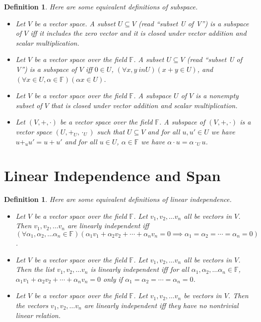 \documentclass[12pt]{article}
\newcounter{prmc}
\newtheorem{dfn}[prmc]{Definition}
\begin{document}
\begin{dfn}
  Here are some equivalent definitions of subspace.
  \begin{itemize}
    \item Let $V$ be a vector space.  A subset $U\subseteq V$ (read
      ``subset U of V'') is a subspace of $V$ iff it includes the zero
      vector and it is closed under vector addition and scalar
      multiplication. 
    \item Let $V$ be a vector space over the field $\mathbb{F}$.  A
      subset $U\subseteq V$ (read ``subset U of V'') is a subspace of
      $V$ iff $0\in U$, $(\forall x,y\ in U)(x+y\in U)$, and $(\forall
      x\in U,\alpha\in\mathbb{F})(\alpha x\in U)$. 
    \item Let $V$ be a vector space over the field $\mathbb{F}$.  A
      subspace $U$ of $V$ is a nonempty subset of $V$ that is closed
      under vector addition and scalar multiplication. 
    \item Let $(V,+,\cdot)$ be a vector space over the field
      $\mathbb{F}$.  A subspace of $(V,+,\cdot)$ is a vector space
      $(U,+_U,\cdot_U)$ such that $U\subseteq V$ and for all $u,u'\in
      U$ we have $u+_uu'=u+u'$ and for all $u\in U$,
      $\alpha\in\mathbb{F}$ we have $\alpha \cdot u=\alpha\cdot_U u$.
  \end{itemize}
\end{dfn}

\section{Linear Independence and Span}

\begin{dfn}
  Here are some equivalent definitions of linear independence.
  \begin{itemize}
    \item Let $V$ be a vector space over the field $\mathbb{F}$.  Let
      $v_1,v_2,\ldots v_n$ all be vectors in $V$.  Then $v_1,
      v_2,\ldots v_n$ are linearly independent iff $(\forall
      \alpha_1,\alpha_2, \ldots
      \alpha_n\in\mathbb{F})(\alpha_1v_1+\alpha_2v_2+\cdots+\alpha_nv_n=0\implies
      \alpha_1=\alpha_2=\cdots=\alpha_n=0)$.
    \item Let $V$ be a vector space over the field $\mathbb{F}$.  Let
      $v_1,v_2,\ldots v_n$ all be vectors in $V$.  Then the list
      $v_1,v_2,\ldots v_n$ is linearly independent iff for all
      $\alpha_1,\alpha_2,\ldots\alpha_n\in\mathbb{F}$,
      $\alpha_1v_1+\alpha_2v_2+\cdots+\alpha_nv_n=0$ only if
      $\alpha_1=\alpha_2=\cdots=\alpha_n=0$.
    \item Let $V$ be a vector space over the field $\mathbb{F}$.  Let
      $v_1, v_2,\ldots v_n$ be vectors in $V$.  Then the vectors $v_1,
      v_2,\ldots v_n$ are linearly independent iff they have no
      nontrivial linear relation.
  \end{itemize}
\end{dfn}
\end{document}

